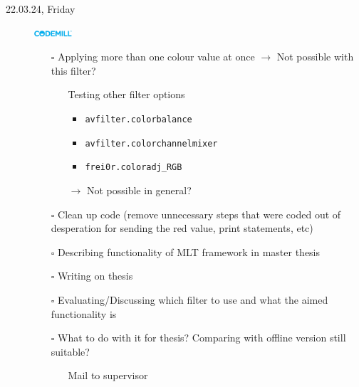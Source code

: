 \documentclass[a4, 11pt]{scrartcl}
\newcommand{\cmark}{\ding{51}}%
\newcommand{\done}{\rlap{$\square$}{\raisebox{2pt}{\large\hspace{1pt}\cmark}}%
	\hspace{-2.5pt}}
\begin{document}
\begin{description}
	
	
	
	
	
	
	


\item[22.03.24, Friday]
\includegraphics[width=1.4cm]{codemill.png}
\begin{itemize}

	
		\item[$\square$] Applying more than one colour value at once $\rightarrow$ Not possible with this filter?
		\begin{itemize}
			\item[\done] Testing other filter options
				\begin{itemize}
					\item \texttt{avfilter.colorbalance}
					\item \texttt{avfilter.colorchannelmixer}
					\item \texttt{frei0r.coloradj\_RGB}
				\end{itemize}
		$\rightarrow$ Not possible in general?
		\end{itemize}	
		
			
		\item[$\square$] Clean up code (remove unnecessary steps that were coded out of desperation for sending the red value, print statements, etc)

		\item[$\square$] Describing functionality of MLT framework in master thesis
		
		\item[$\square$] Writing on thesis
		
		\item[$\square$] Evaluating/Discussing which filter to use and what the aimed functionality is
		
		\item[$\square$] What to do with it for thesis? Comparing with offline version still suitable?
		
		\begin{itemize}
			\item[\done] Mail to supervisor
		\end{itemize}
	
\end{itemize}	
	
	
	
	
	
	
	
	
	
\end{description}	


	
	
	
	
\end{document}
